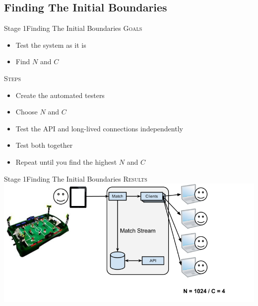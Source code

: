 \documentclass[utf8]{beamer}
\begin{document}
\subsection{Finding The Initial Boundaries}
\begin{frame}{Stage 1}{Finding The Initial Boundaries}
	\textsc{Goals}
	\begin{itemize}
		\item Test the system as it is
		\item Find $N$ and $C$
	\end{itemize}
	\pause
	\textsc{Steps}
	\begin{itemize}
		\item Create the automated testers
		\item Choose $N$ and $C$
		\item Test the API and long-lived connections independently
		\item Test both together
		\item Repeat until you find the highest $N$ and $C$
	\end{itemize}
\end{frame}
\begin{frame}{Stage 1}{Finding The Initial Boundaries}
	\textsc{Results}
	\includegraphics[top=-1,width=\textwidth]{img/MatchStream-1.png}
\end{frame}
\end{document}
